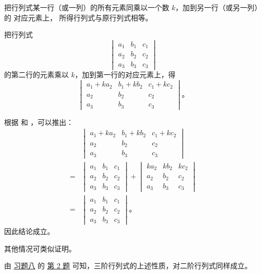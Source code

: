 \begin{theorem} \label{theorem:sjhls-6}
    把行列式某一行（或一列）的所有元素同乘以一个数 $k$，加到另一行（或另一列）的
    对应元素上， 所得行列式与原行列式相等。
\end{theorem}

\zhengming 把行列式
$$
\begin{vmatrix*}
    a_1 & b_1 & c_1 \\
    a_2 & b_2 & c_2 \\
    a_3 & b_3 & c_3
\end{vmatrix*}
$$
的第二行的元素乘以 $k$，加到第一行的对应元素上，得
$$
\begin{vmatrix*}
    a_1 + ka_2 & b_1 + kb_2 & c_1 + kc_2 \\
    a_2 & b_2 & c_2 \\
    a_3 & b_3 & c_3
\end{vmatrix*} \text{。}
$$

根据  和 ，可以推出：
\begin{align*}
      & \begin{vmatrix*}
            a_1 + ka_2 & b_1 + kb_2 & c_1 + kc_2 \\
            a_2 & b_2 & c_2 \\
            a_3 & b_3 & c_3
        \end{vmatrix*} \\
    ={} & \begin{vmatrix*}
            a_1 & b_1 & c_1 \\
            a_2 & b_2 & c_2 \\
            a_3 & b_3 & c_3
          \end{vmatrix*}
        + \begin{vmatrix*}
            ka_2 & kb_2 & kc_2 \\
            a_2 & b_2 & c_2 \\
            a_3 & b_3 & c_3
          \end{vmatrix*} \\
    ={} & \begin{vmatrix*}
            a_1 & b_1 & c_1 \\
            a_2 & b_2 & c_2 \\
            a_3 & b_3 & c_3
          \end{vmatrix*} \text{。}
\end{align*}
因此结论成立。

其他情况可类似证明。

由 \hyperref[xiti-8]{习题八} 的 \hyperref[xiti-8-2]{第 2 题} 可知，三阶行列式的上述性质，对二阶行列式同样成立。


